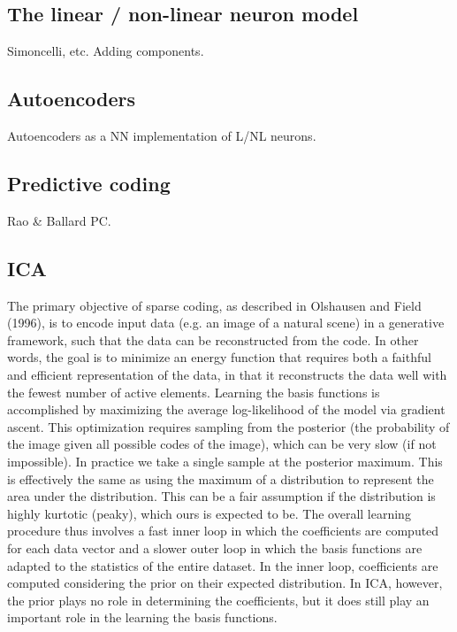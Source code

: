 \subsection{The linear / non-linear neuron model}
Simoncelli, etc. Adding components.


\subsection{Autoencoders}
Autoencoders as a NN implementation of L/NL neurons.


\subsection{Predictive coding}
Rao & Ballard PC.


\subsection{ICA}
The primary objective of sparse coding, as described in Olshausen and Field (1996), is to encode input data (e.g. an image of a natural scene) in a generative framework, such that the data can be reconstructed from the code. In other words, the goal is to minimize an energy function that requires both a faithful and efficient representation of the data, in that it reconstructs the data well with the fewest number of active elements. Learning the basis functions is accomplished by maximizing the average log-likelihood of the model via gradient ascent. This optimization requires sampling from the posterior (the probability of the image given all possible codes of the image), which can be very slow (if not impossible). In practice we take a single sample at the posterior maximum. This is effectively the same as using the maximum of a distribution to represent the area under the distribution. This can be a fair assumption if the distribution is highly kurtotic (peaky), which ours is expected to be. The overall learning procedure thus involves a fast inner loop in which the coefficients are computed for each data vector and a slower outer loop in which the basis functions are adapted to the statistics of the entire dataset. In the inner loop, coefficients are computed considering the prior on their expected distribution. In ICA, however, the prior plays no role in determining the coefficients, but it does still play an important role in the learning the basis functions.

